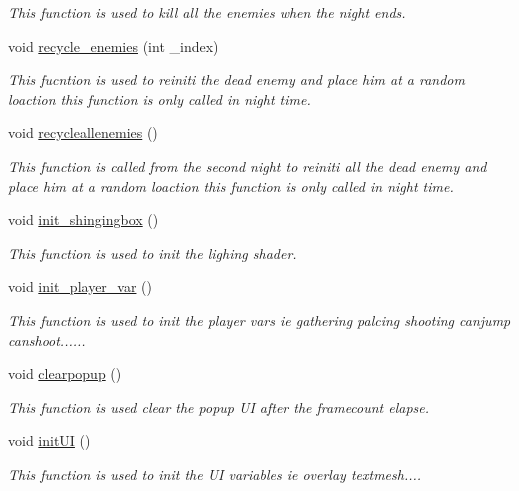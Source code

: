 \begin{DoxyCompactItemize}
\begin{DoxyCompactList}\small\item\em This function is used to kill all the enemies when the night ends. \end{DoxyCompactList}\item 
void \hyperlink{classoctet_1_1minecraft__wars_aded48a159d7e20a3a3179d99bcd58435}{recycle\+\_\+enemies} (int \+\_\+index)
\begin{DoxyCompactList}\small\item\em This fucntion is used to reiniti the dead enemy and place him at a random loaction this function is only called in night time. \end{DoxyCompactList}\item 
void \hyperlink{classoctet_1_1minecraft__wars_afb34a43009cfc0baab3aa513a4dc66ed}{recycleallenemies} ()
\begin{DoxyCompactList}\small\item\em This function is called from the second night to reiniti all the dead enemy and place him at a random loaction this function is only called in night time. \end{DoxyCompactList}\item 
void \hyperlink{classoctet_1_1minecraft__wars_a7af21c40db01d09ba2af5e456149446c}{init\+\_\+shingingbox} ()
\begin{DoxyCompactList}\small\item\em This function is used to init the lighing shader. \end{DoxyCompactList}\item 
void \hyperlink{classoctet_1_1minecraft__wars_a605d1a677b8a449404efeb2e61d1183e}{init\+\_\+player\+\_\+var} ()
\begin{DoxyCompactList}\small\item\em This function is used to init the player vars ie gathering palcing shooting canjump canshoot...... \end{DoxyCompactList}\item 
void \hyperlink{classoctet_1_1minecraft__wars_a7db53f6134296b16d3919f1329fd5ca4}{clearpopup} ()
\begin{DoxyCompactList}\small\item\em This function is used clear the popup U\+I after the framecount elapse. \end{DoxyCompactList}\item 
void \hyperlink{classoctet_1_1minecraft__wars_ab20e3245b90dcbf9b63bef3189e844e8}{init\+U\+I} ()
\begin{DoxyCompactList}\small\item\em This function is used to init the U\+I variables ie overlay textmesh.... \end{DoxyCompactList}\item 

\end{DoxyCompactItemize}
